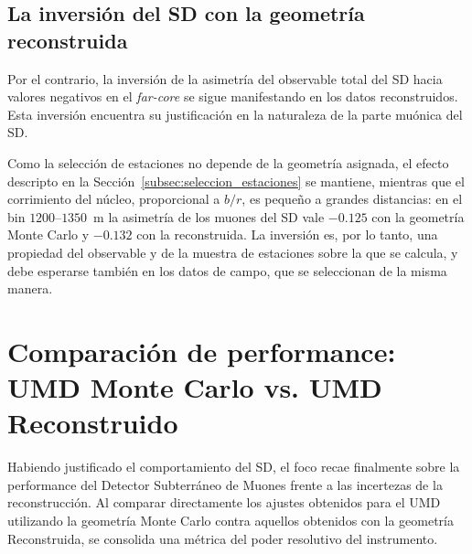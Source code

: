 \subsection{La inversión del SD con la geometría reconstruida}
\label{subsec:inversion_sd_rec}

Por el contrario, la inversión de la asimetría del observable total del SD hacia valores negativos en el \textit{far-core} se sigue manifestando en los datos reconstruidos. Esta inversión encuentra su justificación en la naturaleza de la parte muónica del SD.

Como la selección de estaciones no depende de la geometría asignada, el efecto descripto en la Sección~\ref{subsec:seleccion_estaciones} se mantiene, mientras que el corrimiento del núcleo, proporcional a $b/r$, es pequeño a grandes distancias: en el bin $1200$--$1350$~m la asimetría de los muones del SD vale $-0.125$ con la geometría Monte Carlo y $-0.132$ con la reconstruida. La inversión es, por lo tanto, una propiedad del observable y de la muestra de estaciones sobre la que se calcula, y debe esperarse también en los datos de campo, que se seleccionan de la misma manera.

\section{Comparación de performance: UMD Monte Carlo vs. UMD Reconstruido}
\label{subsec:comparacion_performance_umd}

Habiendo justificado el comportamiento del SD, el foco recae finalmente sobre la performance del Detector Subterráneo de Muones frente a las incertezas de la reconstrucción. Al comparar directamente los ajustes obtenidos para el UMD utilizando la geometría Monte Carlo contra aquellos obtenidos con la geometría Reconstruida, se consolida una métrica del poder resolutivo del instrumento.

